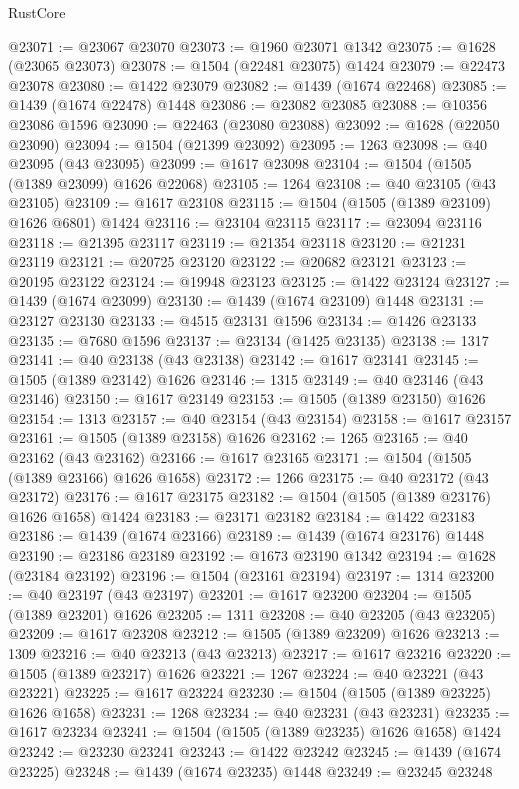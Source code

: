 \begin{lexlean}{RustCore}
\begin{coremodule}
@23071 := @23067 @23070
@23073 := @1960 @23071 @1342
@23075 := @1628 (@23065 @23073)
@23078 := @1504 (@22481 @23075) @1424
@23079 := @22473 @23078
@23080 := @1422 @23079
@23082 := @1439 (@1674 @22468)
@23085 := @1439 (@1674 @22478) @1448
@23086 := @23082 @23085
@23088 := @10356 @23086 @1596
@23090 := @22463 (@23080 @23088)
@23092 := @1628 (@22050 @23090)
@23094 := @1504 (@21399 @23092)
@23095 := 1263
@23098 := @40 @23095 (@43 @23095)
@23099 := @1617 @23098
@23104 := @1504 (@1505 (@1389 @23099) @1626 @22068)
@23105 := 1264
@23108 := @40 @23105 (@43 @23105)
@23109 := @1617 @23108
@23115 := @1504 (@1505 (@1389 @23109) @1626 @6801) @1424
@23116 := @23104 @23115
@23117 := @23094 @23116
@23118 := @21395 @23117
@23119 := @21354 @23118
@23120 := @21231 @23119
@23121 := @20725 @23120
@23122 := @20682 @23121
@23123 := @20195 @23122
@23124 := @19948 @23123
@23125 := @1422 @23124
@23127 := @1439 (@1674 @23099)
@23130 := @1439 (@1674 @23109) @1448
@23131 := @23127 @23130
@23133 := @4515 @23131 @1596
@23134 := @1426 @23133
@23135 := @7680 @1596
@23137 := @23134 (@1425 @23135)
@23138 := 1317
@23141 := @40 @23138 (@43 @23138)
@23142 := @1617 @23141
@23145 := @1505 (@1389 @23142) @1626
@23146 := 1315
@23149 := @40 @23146 (@43 @23146)
@23150 := @1617 @23149
@23153 := @1505 (@1389 @23150) @1626
@23154 := 1313
@23157 := @40 @23154 (@43 @23154)
@23158 := @1617 @23157
@23161 := @1505 (@1389 @23158) @1626
@23162 := 1265
@23165 := @40 @23162 (@43 @23162)
@23166 := @1617 @23165
@23171 := @1504 (@1505 (@1389 @23166) @1626 @1658)
@23172 := 1266
@23175 := @40 @23172 (@43 @23172)
@23176 := @1617 @23175
@23182 := @1504 (@1505 (@1389 @23176) @1626 @1658) @1424
@23183 := @23171 @23182
@23184 := @1422 @23183
@23186 := @1439 (@1674 @23166)
@23189 := @1439 (@1674 @23176) @1448
@23190 := @23186 @23189
@23192 := @1673 @23190 @1342
@23194 := @1628 (@23184 @23192)
@23196 := @1504 (@23161 @23194)
@23197 := 1314
@23200 := @40 @23197 (@43 @23197)
@23201 := @1617 @23200
@23204 := @1505 (@1389 @23201) @1626
@23205 := 1311
@23208 := @40 @23205 (@43 @23205)
@23209 := @1617 @23208
@23212 := @1505 (@1389 @23209) @1626
@23213 := 1309
@23216 := @40 @23213 (@43 @23213)
@23217 := @1617 @23216
@23220 := @1505 (@1389 @23217) @1626
@23221 := 1267
@23224 := @40 @23221 (@43 @23221)
@23225 := @1617 @23224
@23230 := @1504 (@1505 (@1389 @23225) @1626 @1658)
@23231 := 1268
@23234 := @40 @23231 (@43 @23231)
@23235 := @1617 @23234
@23241 := @1504 (@1505 (@1389 @23235) @1626 @1658) @1424
@23242 := @23230 @23241
@23243 := @1422 @23242
@23245 := @1439 (@1674 @23225)
@23248 := @1439 (@1674 @23235) @1448
@23249 := @23245 @23248

\end{coremodule}
\end{lexlean}
